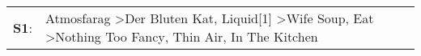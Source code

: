 \begin{supertabular}{p{0.03\textwidth}p{0.92\textwidth}}
 \textbf{S1}:  &  Atmosfarag\textsuperscript{} \textgreater \enspace Der Bluten Kat\textsuperscript{}, \enspace Liquid[1]\textsuperscript{} \textgreater \enspace Wife Soup\textsuperscript{}, \enspace Eat\textsuperscript{} \textgreater \enspace Nothing Too Fancy\textsuperscript{}, \enspace Thin Air\textsuperscript{}, \enspace In The Kitchen\textsuperscript{}  \enspace  \\
\end{supertabular}
